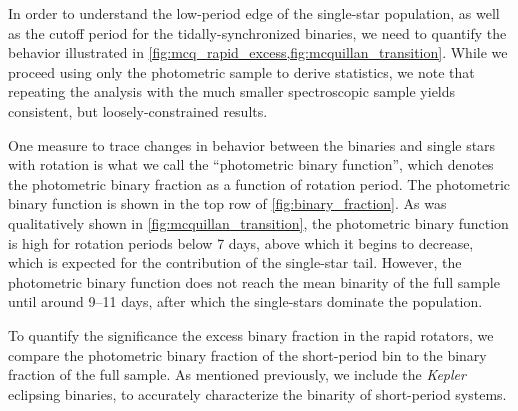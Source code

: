 \documentclass[twocolumn]{aastex6}
\newcommand{\Kepler}{\mbox{\textit{Kepler}}}
\newcommand{\MK}{\ensuremath{M_{Ks}}}
\begin{document}
\begin{figure*}[htb]
    \centering
    \caption{\emph{Top Left:} The photometric binary function for the 
        inclusive photometric binary threshold (\(\Delta \MK{} < -0.2\) mag). The 
        photometric binary fraction for the full sample analyzed by 
        \citet{McQuillan14} is shown as the dotted line. Error bars are 
        1-\(\sigma\) binomial confidence intervals. \emph{Top Right:} Same as 
        the previous plot, except using the more conservative threshold 
        (\(\Delta \MK{} < -0.3\) mag). \emph{Bottom left:} The period distribution of the photometric binary (solid green) 
        and photometric single (dashed purple) samples, each normalized by the 
        total number of photometric binaries and photometric single stars 
        analyzed by \citet{McQuillan14}, respectively, using the inclusive
        photometric binary threshold. Error bars are 1-\(\sigma\) Poisson 
        confidence intervals. \emph{Bottom Right:}
        Same as the previous plot, except with the more conservative vertical
        displacement threshold.}\label{fig:binary_fraction}
\end{figure*}

In order to understand the low-period edge of the single-star population, as
well as the cutoff period for the tidally-synchronized binaries, we need to
quantify the behavior illustrated in
\cref{fig:mcq_rapid_excess,fig:mcquillan_transition}. While we proceed
using only the photometric sample to derive statistics, we note that repeating
the analysis with the much smaller spectroscopic sample yields consistent, but
loosely-constrained results.

One measure to trace
changes in behavior between the binaries and single stars with rotation is 
what we call the ``photometric binary function'', which denotes the 
photometric binary fraction as a function of rotation period. The photometric 
binary function is shown in the top row of \cref{fig:binary_fraction}. As was 
qualitatively shown in \cref{fig:mcquillan_transition}, the photometric binary
function is high for rotation periods below 7 days, above which it begins to
decrease, which is expected for the contribution of the
single-star tail. However, the photometric binary function does not reach the 
mean binarity of the full sample until around 9--11 days, after which the 
single-stars dominate the population.

To quantify the significance the excess binary fraction in the rapid rotators, 
we compare the photometric binary fraction of the short-period bin to the
binary fraction of the full sample. As mentioned previously, we include the 
\Kepler{} eclipsing binaries, to accurately characterize the binarity of
short-period systems.
\end{document}
